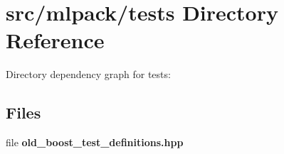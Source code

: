 \section{src/mlpack/tests Directory Reference}
\label{dir_095252027090b88afb57ccc936f5199d}
Directory dependency graph for tests\-:
\subsection*{Files}
\begin{DoxyCompactItemize}
\item 
file {\bf old\-\_\-boost\-\_\-test\-\_\-definitions.\-hpp}
\end{DoxyCompactItemize}

